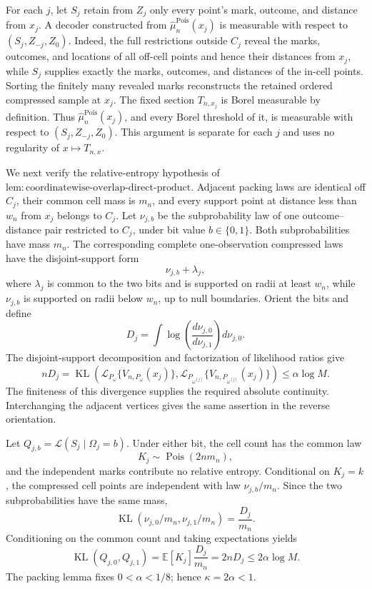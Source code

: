 For each \(j\), let \(S_j\) retain from \(Z_j\) only every point's mark, outcome, and distance from \(x_j\).  A decoder constructed from \(\widehat\mu_n^{\mathrm{Pois}}(x_j)\) is measurable with respect to \((S_j,Z_{-j},Z_0)\).  Indeed, the full restrictions outside \(C_j\) reveal the marks, outcomes, and locations of all off-cell points and hence their distances from \(x_j\), while \(S_j\) supplies exactly the marks, outcomes, and distances of the in-cell points.  Sorting the finitely many revealed marks reconstructs the retained ordered compressed sample at \(x_j\).  The fixed section \(T_{n,x_j}\) is Borel measurable by definition.  Thus \(\widehat\mu_n^{\mathrm{Pois}}(x_j)\), and every Borel threshold of it, is measurable with respect to \((S_j,Z_{-j},Z_0)\).  This argument is separate for each \(j\) and uses no regularity of \(x\mapsto T_{n,x}\).

We next verify the relative-entropy hypothesis of \(\mathrm{lem:coordinatewise\text{-}overlap\text{-}direct\text{-}product}\).  Adjacent packing laws are identical off \(C_j\), their common cell mass is \(m_n\), and every support point at distance less than \(w_n\) from \(x_j\) belongs to \(C_j\).  Let \(\nu_{j,b}\) be the subprobability law of one outcome--distance pair restricted to \(C_j\), under bit value \(b\in\{0,1\}\).  Both subprobabilities have mass \(m_n\).  The corresponding complete one-observation compressed laws have the disjoint-support form
\[
 \nu_{j,b}+\lambda_j,
\]
where \(\lambda_j\) is common to the two bits and is supported on radii at least \(w_n\), while \(\nu_{j,b}\) is supported on radii below \(w_n\), up to null boundaries.  Orient the bits and define
\[
 D_j=\int\log\!\left(\frac{d\nu_{j,0}}{d\nu_{j,1}}\right)d\nu_{j,0}.
\]
The disjoint-support decomposition and factorization of likelihood ratios give
\[
 nD_j
 =\operatorname{KL}\!\left(
 \mathcal L_{P_\omega}\{V_{n,P_\omega}(x_j)\},
 \mathcal L_{P_{\omega^{(j)}}}\{V_{n,P_{\omega^{(j)}}}(x_j)\}
 \right)
 \leq\alpha\log M.
\]
The finiteness of this divergence supplies the required absolute continuity.  Interchanging the adjacent vertices gives the same assertion in the reverse orientation.

Let \(Q_{j,b}=\mathcal L(S_j\mid\Omega_j=b)\).  Under either bit, the cell count has the common law
\[
 K_j\sim\operatorname{Pois}(2nm_n),
\]
and the independent marks contribute no relative entropy.  Conditional on \(K_j=k\), the compressed cell points are independent with law \(\nu_{j,b}/m_n\).  Since the two subprobabilities have the same mass,
\[
 \operatorname{KL}(\nu_{j,0}/m_n,\nu_{j,1}/m_n)
 =\frac{D_j}{m_n}.
\]
Conditioning on the common count and taking expectations yields
\[
 \operatorname{KL}(Q_{j,0},Q_{j,1})
 =\mathbb E[K_j]\frac{D_j}{m_n}
 =2nD_j
 \leq2\alpha\log M.
\]
The packing lemma fixes \(0<\alpha<1/8\); hence \(\kappa=2\alpha<1\).

